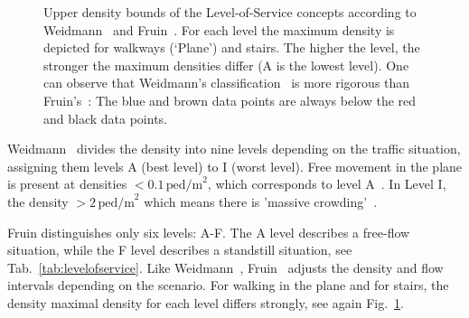 \begin{figure}[hbt!]
\centering
{}
\caption{Upper density bounds of the Level-of-Service concepts according to Weidmann~\cite{weidmann-1994-cdyn} and Fruin~\cite{fruin-1971-cdyn}. For each level the maximum density is depicted for walkways (`Plane') and stairs. The higher the level, the stronger the maximum densities differ (A is the lowest level). One can observe that Weidmann's classification~\cite{weidmann-1994-cdyn} is more rigorous than Fruin's~\cite{fruin-1971-cdyn}: The blue and brown data points are always below the red and black data points.  }
\label{fig:fruinweidmann}
\end{figure}

Weidmann~\cite{weidmann-1994-cdyn} divides the density into nine levels depending on the traffic situation, assigning them levels A (best level) to I (worst level). Free movement in the plane is present at densities $<0.1\,\text{ped/m}^2$, which corresponds to level A~\cite[p.97]{weidmann-1994-cdyn}. In Level I, the density $>2\,\text{ped/m}^2$ which means there is 'massive crowding'~\cite[p.97]{weidmann-1994-cdyn}. 

Fruin distinguishes only six levels: A-F. The A level describes a free-flow situation, while the F level describes a standstill situation, see Tab.~\ref{tab:levelofservice}. Like Weidmann~\cite{weidmann-1994-cdyn}, Fruin~\cite{fruin-1971-cdyn} adjusts the density and flow intervals depending on the scenario. For walking in the plane and for stairs, the density maximal density for each level differs strongly, see again Fig.~\ref{fig:fruinweidmann}. 

